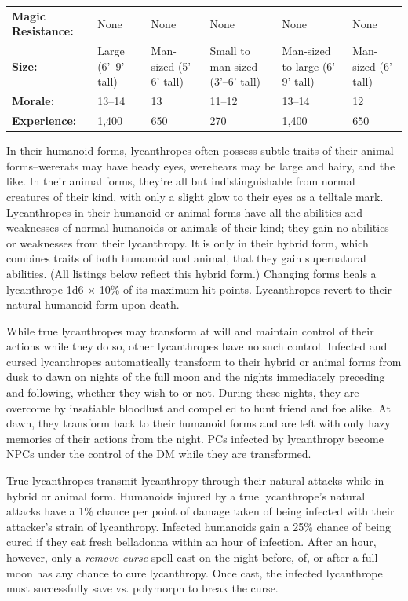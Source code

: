 \begin{minipage}{\columnwidth}
\begin{tabular}{p{}g{.13\columnwidth}p{.14\columnwidth}g{.14\columnwidth}p{.13\columnwidth}g{.13\columnwidth}}
\textbf{Magic Resistance:} 	& None	& None	& None	& None	& None	\\
\textbf{Size:} 				& Large (6'--9' tall)	& Man-sized (5'--6' tall)	& Small to man-sized (3'--6' tall)	& Man-sized to large (6'--9' tall)	& Man-sized (6' tall)	\\
\textbf{Morale:} 			& 13--14	& 13	& 11--12	& 13--14	& 12	\\
\textbf{Experience:} 		& 1,400	& 650	& 270	& 1,400	& 650	\\ %
\end{tabular}

\end{minipage}

\begin{multicols}{2}

In their humanoid forms, lycanthropes often possess subtle traits of their animal forms--wererats may have beady eyes, werebears may be large and hairy, and the like. In their animal forms, they're all but indistinguishable from normal creatures of their kind, with only a slight glow to their eyes as a telltale mark. Lycanthropes in their humanoid or animal forms have all the abilities and weaknesses of normal humanoids or animals of their kind; they gain no abilities or weaknesses from their lycanthropy. It is only in their hybrid form, which combines traits of both humanoid and animal, that they gain supernatural abilities. (All listings below reflect this hybrid form.) Changing forms heals a lycanthrope 1d6 $\times$ 10\% of its maximum hit points. Lycanthropes revert to their natural humanoid form upon death.

While true lycanthropes may transform at will and maintain control of their actions while they do so, other lycanthropes have no such control. Infected and cursed lycanthropes automatically transform to their hybrid or animal forms from dusk to dawn on nights of the full moon and the nights immediately preceding and following, whether they wish to or not. During these nights, they are overcome by insatiable bloodlust and compelled to hunt friend and foe alike. At dawn, they transform back to their humanoid forms and are left with only hazy memories of their actions from the night. PCs infected by lycanthropy become NPCs under the control of the DM while they are transformed.

True lycanthropes transmit lycanthropy through their natural attacks while in hybrid or animal form. Humanoids injured by a true lycanthrope's natural attacks have a 1\% chance per point of damage taken of being infected with their attacker's strain of lycanthropy. Infected humanoids gain a 25\% chance of being cured if they eat fresh belladonna within an hour of infection. After an hour, however, only a \textit{remove curse} spell cast on the night before, of, or after a full moon has any chance to cure lycanthropy. Once cast, the infected lycanthrope must successfully save vs. polymorph to break the curse.


\end{multicols}
